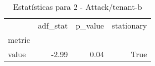 \begin{table}[htbp]
\caption{Estatísticas para 2 - Attack/tenant-b}
\label{tab:2_-_attack_tenant-b_adf_test}
\begin{tabular}{lrrr}
\toprule
 & adf_stat & p_value & stationary \\
metric &  &  &  \\
\midrule
value & -2.99 & 0.04 & True \\
\bottomrule
\end{tabular}
\end{table}

